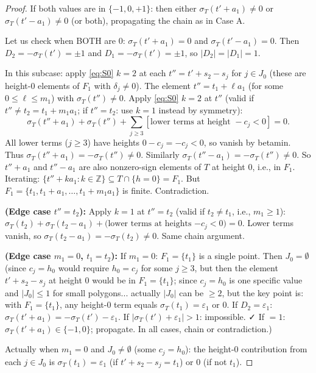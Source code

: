 \begin{proof}
If both values are in $\{-1,0,+1\}$: then either $\sigma_T(t'+a_1) \neq 0$ or
$\sigma_T(t'-a_1) \neq 0$ (or both), propagating the chain as in Case A.

Let us check when BOTH are $0$:
$\sigma_T(t'+a_1) = 0$ and $\sigma_T(t'-a_1) = 0$.
Then $D_2 = -\sigma_T(t') = \pm 1$ and $D_1 = -\sigma_T(t') = \pm 1$, so $|D_2|=|D_1|=1$.

In this subcase: apply \eqref{eq:S0} $k=2$ at each $t'' = t'+s_2-s_j$ for $j \in J_0$
(these are height-0 elements of $F_1$ with $\delta_j \neq 0$).
The element $t'' = t_1 + \ell a_1$ (for some $0 \leq \ell \leq m_1$) with $\sigma_T(t'') \neq 0$.
Apply \eqref{eq:S0} $k=2$ at $t''$ (valid if $t'' \neq t_2 = t_1+m_1a_1$;
if $t''=t_2$: use $k=1$ instead by symmetry):
\[
  \sigma_T(t''+a_1) + \sigma_T(t'') + \sum_{j \geq 3} [\text{lower terms at height } -c_j < 0] = 0.
\]
All lower terms ($j \geq 3$) have heights $0-c_j = -c_j < 0$, so vanish by betamin.
Thus $\sigma_T(t''+a_1) = -\sigma_T(t'') \neq 0$.  Similarly $\sigma_T(t''-a_1) = -\sigma_T(t'') \neq 0$.
So $t''+a_1$ and $t''-a_1$ are also nonzero-sign elements of $T$ at height $0$, i.e., in $F_1$.
Iterating: $\{t''+ka_1 : k \in \mathbb{Z}\} \subseteq T \cap \{h=0\} = F_1$.
But $F_1 = \{t_1, t_1+a_1, \ldots, t_1+m_1a_1\}$ is finite.  Contradiction. \checkmark

\textbf{(Edge case $t'' = t_2$):}
Apply $k=1$ at $t'' = t_2$ (valid if $t_2 \neq t_1$, i.e., $m_1 \geq 1$):
$\sigma_T(t_2) + \sigma_T(t_2-a_1) + \text{(lower terms at heights $-c_j<0$)}=0$.
Lower terms vanish, so $\sigma_T(t_2-a_1) = -\sigma_T(t_2) \neq 0$.  Same chain argument. \checkmark

\textbf{(Edge case $m_1=0$, $t_1=t_2$):}
If $m_1=0$: $F_1=\{t_1\}$ is a single point.  Then $J_0=\emptyset$ (since $c_j=h_0$ would
require $h_0 = c_j$ for some $j\geq 3$, but then the element $t'+s_2-s_j$ at height $0$
would be in $F_1=\{t_1\}$; since $c_j=h_0$ is one specific value and $|J_0|\leq 1$ for
small polygons... actually $|J_0|$ can be $\geq 2$, but the key point is: with $F_1=\{t_1\}$,
any height-0 term equals $\sigma_T(t_1)=\varepsilon_1$ or $0$.  If $D_2 = \varepsilon_1$:
$\sigma_T(t'+a_1) = -\sigma_T(t')-\varepsilon_1$.  If $|\sigma_T(t')+\varepsilon_1|>1$: impossible. ✓
If $=1$: $\sigma_T(t'+a_1)\in\{-1,0\}$; propagate. In all cases, chain or contradiction.)

Actually when $m_1=0$ and $J_0\neq\emptyset$ (some $c_j=h_0$): the height-0 contribution from
each $j\in J_0$ is $\sigma_T(t_1)=\varepsilon_1$ (if $t'+s_2-s_j=t_1$) or $0$ (if not $t_1$).


\end{proof}
